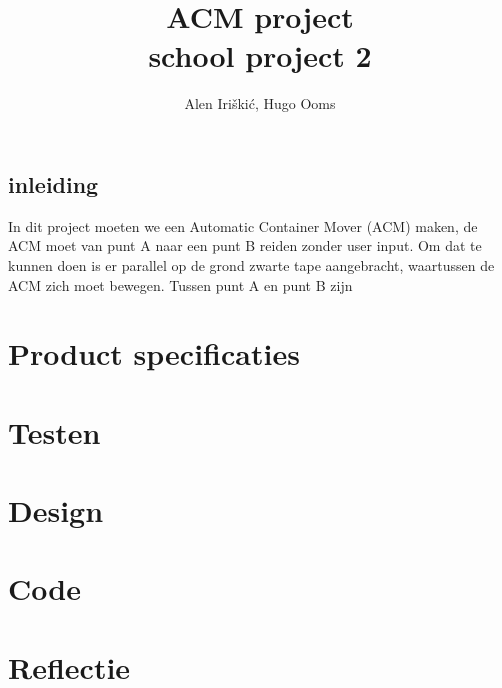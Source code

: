 \documentclass{report}
\title{ ACM project \\
    \large school project 2}
\author{Alen Iriškić, Hugo Ooms}
\begin{document}
\maketitle


\tableofcontents
\pagebreak

\section{inleiding}

In dit project moeten we een Automatic Container Mover (ACM) maken, de ACM moet van punt A naar een punt B reiden zonder user input. Om dat te kunnen doen is er parallel op de grond zwarte tape aangebracht, waartussen de ACM zich moet bewegen. Tussen punt A en punt B zijn

\chapter{Product specificaties}


\chapter{Testen}



\chapter{Design}


\chapter{Code}


\chapter{Reflectie}
\end{document}
